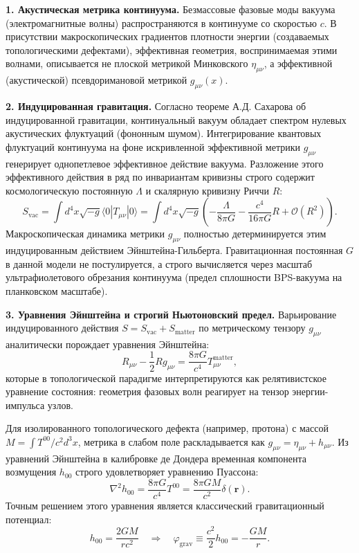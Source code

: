 \documentclass[11pt,a4paper]{article}
\begin{document}
	\textbf{1. Акустическая метрика континуума.}
	Безмассовые фазовые моды вакуума (электромагнитные волны) распространяются в континууме со скоростью $c$. В присутствии макроскопических градиентов плотности энергии (создаваемых топологическими дефектами), эффективная геометрия, воспринимаемая этими волнами, описывается не плоской метрикой Минковского $\eta_{\mu\nu}$, а эффективной (акустической) псевдоримановой метрикой $g_{\mu\nu}(x)$. 
	
	\textbf{2. Индуцированная гравитация.}
	Согласно теореме А.Д. Сахарова об индуцированной гравитации, континуальный вакуум обладает спектром нулевых акустических флуктуаций (фононным шумом). Интегрирование квантовых флуктуаций континуума на фоне искривленной эффективной метрики $g_{\mu\nu}$ генерирует однопетлевое эффективное действие вакуума. 
	Разложение этого эффективного действия в ряд по инвариантам кривизны строго содержит космологическую постоянную $\Lambda$ и скалярную кривизну Риччи $R$:
	\begin{equation}
		S_{\text{vac}} = \int d^4x \sqrt{-g} \langle 0 | T_{\mu\nu} | 0 \rangle = \int d^4x \sqrt{-g} \left( - \frac{\Lambda}{8\pi G} - \frac{c^4}{16\pi G} R + \mathcal{O}(R^2) \right).
	\end{equation}
	Макроскопическая динамика метрики $g_{\mu\nu}$ полностью детерминируется этим индуцированным действием Эйнштейна-Гильберта. Гравитационная постоянная $G$ в данной модели не постулируется, а строго вычисляется через масштаб ультрафиолетового обрезания континуума (предел сплошности BPS-вакуума на планковском масштабе).
	
	\textbf{3. Уравнения Эйнштейна и строгий Ньютоновский предел.}
	Варьирование индуцированного действия $S = S_{\text{vac}} + S_{\text{matter}}$ по метрическому тензору $g_{\mu\nu}$ аналитически порождает уравнения Эйнштейна:
	\begin{equation}
		R_{\mu\nu} - \frac{1}{2}R g_{\mu\nu} = \frac{8\pi G}{c^4} T_{\mu\nu}^{\text{matter}},
	\end{equation}
	которые в топологической парадигме интерпретируются как релятивистское уравнение состояния: геометрия фазовых волн реагирует на тензор энергии-импульса узлов.
	
	Для изолированного топологического дефекта (например, протона) с массой $M = \int T^{00}/c^2 d^3x$, метрика в слабом поле раскладывается как $g_{\mu\nu} = \eta_{\mu\nu} + h_{\mu\nu}$. Из уравнений Эйнштейна в калибровке де Дондера временная компонента возмущения $h_{00}$ строго удовлетворяет уравнению Пуассона:
	\begin{equation}
		\nabla^2 h_{00} = \frac{8\pi G}{c^4} T^{00} = \frac{8\pi G M}{c^2} \delta(\mathbf{r}).
	\end{equation}
	Точным решением этого уравнения является классический гравитационный потенциал:
	\begin{equation}
		h_{00} = \frac{2 G M}{r c^2} \quad \Longrightarrow \quad \varphi_{\text{grav}} \equiv \frac{c^2}{2} h_{00} = - \frac{GM}{r}.
	\end{equation}
	
\end{document}
